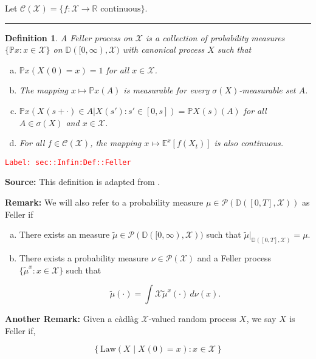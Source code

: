 \documentclass[12pt]{article}
\newcommand{\mb}{\mathbb}
\newcommand{\mc}{\mathcal}
\newcommand{\ra}{\rightarrow}
\newcommand{\te}{\text}
\newcommand{\tr}{\textcolor{red}}
\newcommand{\labe}[1]{\tr{\texttt{Label: #1}}}
\newcommand{\lin}{\rule{\linewidth}{0.4 pt}}
\newcommand{\pr}{\mb{P}}							%
\newcommand{\exmu}[2]{\mb{E}^{#1}\left[#2\right]}	%
\newcommand{\cad}{\mb{D}}							%
\newcommand{\T}{T}								%
\newcommand{\x}{x}								%
\renewcommand{\t}{t}							%
\renewcommand{\tt}{s}							%
\newcommand{\ttt}{s'}							%
\newcommand{\X}{X}								%
\newcommand{\f}{f}								%
\newcommand{\cind}[1]{_{#1}}					%
\newcommand{\tp}[1]{(#1)}						%
\newcommand{\tip}[1]{#1}						%
\newcommand{\cont}{\mc{C}}						%
\newcommand{\alt}[1]{\widetilde{#1}}			%
\newcommand{\m}{\mu}							%
\newcommand{\mm}{\nu}							%
\newcommand{\law}{\te{Law}}						%
\newcommand{\typset}{A}							%
\newcommand{\spce}{\mc{X}}						%
\newtheorem{defn}[thms]{Definition}
\begin{document}
Let \(\cont(\spce)= \{f:\spce \ra \mb{R} \te{ continuous}\}\).

\lin

\begin{defn}
A Feller process on \(\spce\) is a collection of probability measures \(\{\pr{\x}:\x \in \spce\}\) on \(\cad([0,\infty),\spce)\) with canonical process \(\X\) such that

\begin{enumerate}[(a)]
\item \(\pr{\x}(\X\cind{}\tp{0} = \x) = 1\) for all \(\x \in \spce\).

\item The mapping \(\x \mapsto \pr{\x}(\typset)\) is measurable for every \(\sigma(\X)\)-measurable set \(\typset\).

\item \(\pr{\x}(\X\cind{}\tp{\tt+\cdot} \in \typset|\X\cind{}\tp{\ttt}:\ttt \in [0,\tt]) = \pr{\X\cind{}\tp{\tt}}(\typset)\) for all \(\typset \in \sigma(\X)\) and \(\x \in \spce\).

\item For all \(\f\in \cont(\spce)\), the mapping \(\x\mapsto \exmu{\x}{\f(\X_{\t})}\) is also continuous.
\end{enumerate}
\label{sec::Infin:Def::Feller}
\end{defn}
\labe{sec::Infin:Def::Feller}

\textbf{Source: } This definition is adapted from \cite[Definition 1.1,1.2]{Lig85}.

\textbf{Remark: } We will also refer to a probability measure \(\m \in \mc{P}(\cad([0,\T],\spce))\) as Feller if

\begin{enumerate}[(a)]
\item There exists an measure \(\alt{\m}\in \mc{P}(\cad([0,\infty),\spce))\) such that \(\alt{\m}|_{\cad([0,T],\spce)} = \m\).

\item There exists a probability measure \(\mm\in \mc{P}(\spce)\) and a Feller process \(\{\alt{\m}^\x:\x \in \spce\}\) such that 

\[\alt{\m}(\cdot) = \int{\spce} \alt{\m}^\x(\cdot)\,d\mm(\x).\]
\end{enumerate}

\textbf{Another Remark: } Given a c\`adl\`ag \(\spce\)-valued random process \(\X\cind{}\tip{}\), we say \(\X\cind{}\tip{}\) is Feller if,

\[\left\{\law\left(\X\cind{}\tip{}\middle|\X\cind{}\tp{0} = \x\cind{}\tip{}\right): \x\cind{}\tip{} \in \spce\right\}\]
\end{document}
